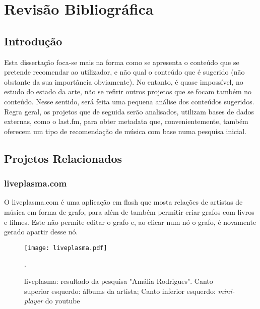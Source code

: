 
\chapter{Revisão Bibliográfica} \label{chap:chap2}

\section*{}

\section{Introdução}

Esta dissertação foca-se mais na forma como se apresenta o conteúdo que se pretende recomendar ao utilizador, e não qual o conteúdo que é sugerido (não obstante da sua importância obviamente).
No entanto, é quase impossível, no estudo do estado da arte, não se refirir outros projetos que se focam também no conteúdo.
Nesse sentido, será feita uma pequena análise dos conteúdos sugeridos.
Regra geral, os projetos que de seguida serão analisados, utilizam bases de dados externas, como o last.fm, para obter metadata que, convenientemente, também oferecem um tipo de recomendação de música com base numa pesquisa inicial.

\section{Projetos Relacionados} %
\label{sec:projetos_relacionados}


\subsection{liveplasma.com} %
\label{sub:projeto_1}

O liveplasma.com é uma aplicação em flash que mosta relações de artistas de música em forma de grafo, para além de também permitir criar grafos com livros e filmes.
Este não permite editar o grafo e, ao clicar num nó o grafo, é novamente gerado apartir desse nó.

\begin{figure}[tb]
  \begin{center}
    \texttt{[image: liveplasma.pdf]}
  \end{center}
  \caption{liveplasma: resultado da pesquisa "Amália Rodrigues". Canto superior esquerdo: álbums da artista; Canto inferior esquerdo: \emph{mini-player} do youtube}.
  \label{fig:sota_liveplasma}
\end{figure}

